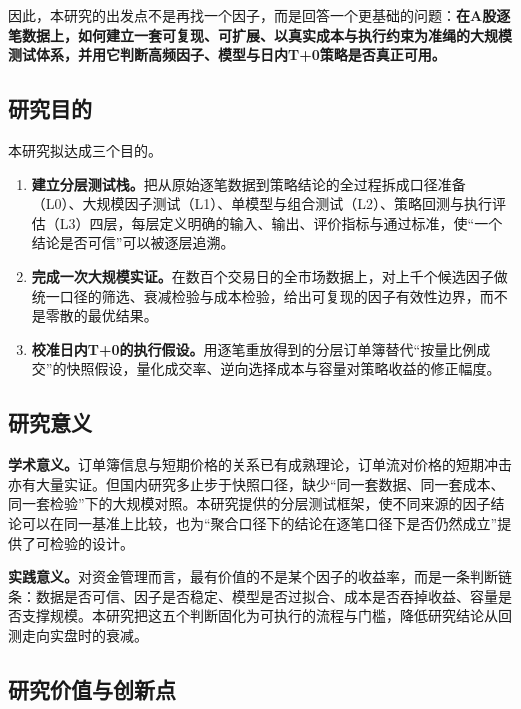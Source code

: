 \documentclass[11pt,a4paper]{article}
\begin{document}
因此，本研究的出发点不是再找一个因子，而是回答一个更基础的问题：\textbf{在A股逐笔数据上，如何建立一套可复现、可扩展、以真实成本与执行约束为准绳的大规模测试体系，并用它判断高频因子、模型与日内T+0策略是否真正可用。}

\subsection*{研究目的}

本研究拟达成三个目的。

\begin{enumerate}
  \item \textbf{建立分层测试栈。}把从原始逐笔数据到策略结论的全过程拆成口径准备（L0）、大规模因子测试（L1）、单模型与组合测试（L2）、策略回测与执行评估（L3）四层，每层定义明确的输入、输出、评价指标与通过标准，使``一个结论是否可信''可以被逐层追溯。
  \item \textbf{完成一次大规模实证。}在数百个交易日的全市场数据上，对上千个候选因子做统一口径的筛选、衰减检验与成本检验，给出可复现的因子有效性边界，而不是零散的最优结果。
  \item \textbf{校准日内T+0的执行假设。}用逐笔重放得到的分层订单簿替代``按量比例成交''的快照假设，量化成交率、逆向选择成本与容量对策略收益的修正幅度。
\end{enumerate}

\subsection*{研究意义}

\textbf{学术意义。}订单簿信息与短期价格的关系已有成熟理论\citep{kyle1985,glosten1985}，订单流对价格的短期冲击亦有大量实证\citep{hasbrouck1991,cont2014}。但国内研究多止步于快照口径，缺少``同一套数据、同一套成本、同一套检验''下的大规模对照。本研究提供的分层测试框架，使不同来源的因子结论可以在同一基准上比较，也为``聚合口径下的结论在逐笔口径下是否仍然成立''提供了可检验的设计。

\textbf{实践意义。}对资金管理而言，最有价值的不是某个因子的收益率，而是一条判断链条：数据是否可信、因子是否稳定、模型是否过拟合、成本是否吞掉收益、容量是否支撑规模。本研究把这五个判断固化为可执行的流程与门槛，降低研究结论从回测走向实盘时的衰减。

\subsection*{研究价值与创新点}
\end{document}
